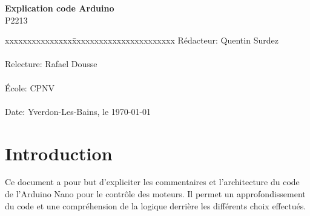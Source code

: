 \documentclass[
	a4paper,									%
	11pt,										%
	twoside,									%
	openright,									%
	notitlepage,									%
	parskip=half,								%
]{scrreprt}										%
\begin{document}
\begin{titlepage}
	\vspace{3cm}

	\fontsize{30pt}{32pt}\selectfont 
	\noindent \textbf{Explication code Arduino} \\

	\fontsize{18pt}{20pt}\selectfont\vspace{0.3em} P2213 \\

	\vspace{4cm}
	\fontsize{12pt}{15pt}\selectfont
	\begin{tabbing}
		xxxxxxxxxxxxxxx\=xxxxxxxxxxxxxxxxxxxxxxx \kill
		Rédacteur:\> Quentin Surdez\\ \\
		Relecture:\> Rafael Dousse\\ \\
		École:\> CPNV\\ \\
		Date:\> Yverdon-Les-Bains, le \today \\
	\end{tabbing}
\end{titlepage}

\tableofcontents

\listoffigures									%
\cleardoublepage

\setcounter{page}{1}

\chapter{Introduction}
Ce document a pour but d'expliciter les commentaires et l'architecture du code de l'Arduino Nano pour le contrôle des moteurs. 
Il permet un approfondissement du code et une compréhension de la logique derrière les différents choix effectués.

\end{document}
